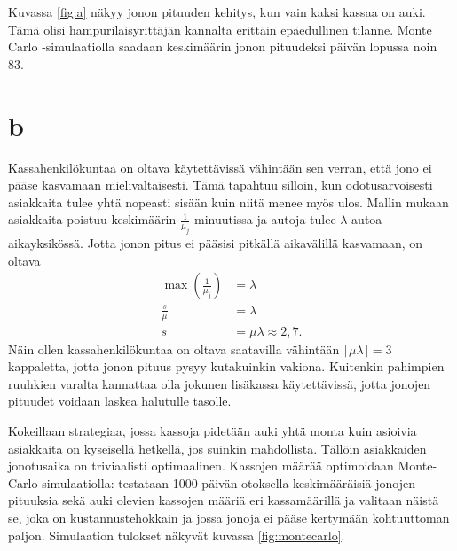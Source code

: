 \documentclass{article}     %
\begin{document}
Kuvassa \ref{fig:a} näkyy jonon pituuden kehitys, kun vain kaksi kassaa on auki. Tämä olisi hampurilaisyrittäjän kannalta erittäin epäedullinen tilanne. Monte Carlo -simulaatiolla saadaan keskimäärin jonon pituudeksi päivän lopussa noin 83.

\section*{b}
Kassahenkilökuntaa on oltava käytettävissä vähintään sen verran, että jono ei pääse kasvamaan mielivaltaisesti. Tämä tapahtuu silloin, kun odotusarvoisesti asiakkaita tulee yhtä nopeasti sisään kuin niitä menee myös ulos. Mallin mukaan asiakkaita poistuu keskimäärin $\frac{1}{\mu_j}$ minuutissa ja autoja tulee $\lambda$ autoa aikayksikössä. Jotta jonon pitus ei pääsisi pitkällä aikavälillä kasvamaan, on oltava
\begin{align}
\max\left(\frac{1}{\mu_j}\right) &= \lambda \nonumber\\
\frac{s}{\mu} &= \lambda \nonumber\\
s &= \mu \lambda \approx 2,7.
\end{align}
Näin ollen kassahenkilökuntaa on oltava saatavilla vähintään $\lceil \mu \lambda \rceil = 3$ kappaletta, jotta jonon pituus pysyy kutakuinkin vakiona. Kuitenkin pahimpien ruuhkien varalta kannattaa olla jokunen lisäkassa käytettävissä, jotta jonojen pituudet voidaan laskea halutulle tasolle.

Kokeillaan strategiaa, jossa kassoja pidetään auki yhtä monta kuin asioivia asiakkaita on kyseisellä hetkellä, jos suinkin mahdollista. Tällöin asiakkaiden jonotusaika on triviaalisti optimaalinen. Kassojen määrää optimoidaan Monte-Carlo simulaatiolla: testataan 1000 päivän otoksella keskimääräisiä jonojen pituuksia sekä auki olevien kassojen määriä eri kassamäärillä ja valitaan näistä se, joka on kustannustehokkain ja jossa jonoja ei pääse kertymään kohtuuttoman paljon. Simulaation tulokset näkyvät kuvassa \ref{fig:montecarlo}.
\end{document}
